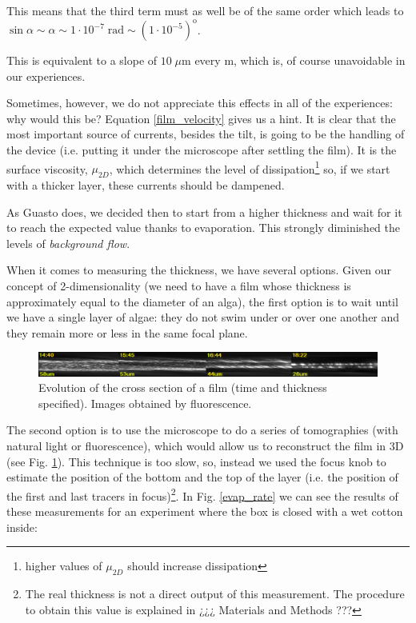 This means that the third term must as well be of the same order which leads to $\sin \alpha \sim  \alpha \sim 1\cdot 10^{-7} \; \textrm{rad} \sim (1\cdot 10^{-5})^\textrm{o}$.

This is equivalent to a slope of $10 \; \mu \textrm{m}$ every $\textrm{m}$, which is, of course unavoidable in our experiences.

Sometimes, however, we do not appreciate this effects in all of the experiences: why would this be? Equation \ref{film_velocity} gives us a hint. It is clear that the most important source of currents, besides the tilt, is going to be the handling of the device (i.e. putting it under the microscope after settling the film). It is the surface viscosity, $\mu_{2D}$, which determines the level of dissipation\footnote{higher values of $\mu_{2D}$ should increase dissipation} so, if we start with a thicker layer, these currents should be dampened.

As Guasto does, we decided then to start from a higher thickness and wait for it to reach the expected value thanks to evaporation. This strongly diminished the levels of \textit{background flow}.

When it comes to measuring the thickness, we have several options. Given our concept of 2-dimensionality (we need to have a film whose thickness is approximately equal to the diameter of an alga), the first option is to wait until we have a single layer of algae: they do not swim under or over one another and they remain more or less in the same focal plane.

\begin{figure}[H]
	\centering
	\includegraphics[width=\textwidth]{archivos/ThicknessEvolution.png}
	\caption{Evolution of the cross section of a film (time and thickness specified). Images obtained by fluorescence.}
	\label{thickness}
\end{figure}

The second option is to use the microscope to do a series of tomographies (with natural light or fluorescence), which would allow us to reconstruct the film in 3D (see Fig. \ref{thickness}). This technique is too slow, so, instead we used the focus knob to estimate the position of the bottom and the top of the layer (i.e. the position of the first and last tracers in focus)\footnote{The real thickness is not a direct output of this measurement. The procedure to obtain this value is explained in ¿¿¿ Materials and Methods ???}. In Fig. \ref{evap_rate} we can see the results of these measurements for an experiment where the box is closed with a wet cotton inside:

